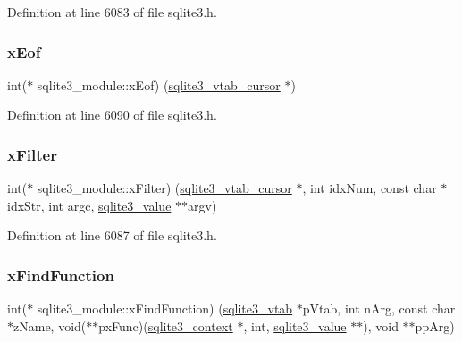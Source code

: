 Definition at line 6083 of file sqlite3.\+h.

\mbox{\label{structsqlite3__module_afad8fda57fb28a01196230bc554e44b1}} 
\subsubsection{\texorpdfstring{x\+Eof}{xEof}}
{\footnotesize\ttfamily int($\ast$ sqlite3\+\_\+module\+::x\+Eof) (\mbox{\hyperlink{structsqlite3__vtab__cursor}{sqlite3\+\_\+vtab\+\_\+cursor}} $\ast$)}



Definition at line 6090 of file sqlite3.\+h.

\mbox{\label{structsqlite3__module_a46ba11ba4d07f7fdcab4f35bf2045300}} 
\subsubsection{\texorpdfstring{x\+Filter}{xFilter}}
{\footnotesize\ttfamily int($\ast$ sqlite3\+\_\+module\+::x\+Filter) (\mbox{\hyperlink{structsqlite3__vtab__cursor}{sqlite3\+\_\+vtab\+\_\+cursor}} $\ast$, int idx\+Num, const char $\ast$idx\+Str, int argc, \mbox{\hyperlink{sqlite3_8h_ac2fa1ecdb2290d9af6010edbd1cbc83c}{sqlite3\+\_\+value}} $\ast$$\ast$argv)}



Definition at line 6087 of file sqlite3.\+h.

\mbox{\label{structsqlite3__module_afb7bf9d156a767a50f5e9d92b135a80f}} 
\subsubsection{\texorpdfstring{x\+Find\+Function}{xFindFunction}}
{\footnotesize\ttfamily int($\ast$ sqlite3\+\_\+module\+::x\+Find\+Function) (\mbox{\hyperlink{structsqlite3__vtab}{sqlite3\+\_\+vtab}} $\ast$p\+Vtab, int n\+Arg, const char $\ast$z\+Name, void($\ast$$\ast$px\+Func)(\mbox{\hyperlink{sqlite3_8h_a3b519553ffec8fc42b2356f5b1ebdc57}{sqlite3\+\_\+context}} $\ast$, int, \mbox{\hyperlink{sqlite3_8h_ac2fa1ecdb2290d9af6010edbd1cbc83c}{sqlite3\+\_\+value}} $\ast$$\ast$), void $\ast$$\ast$pp\+Arg)}



